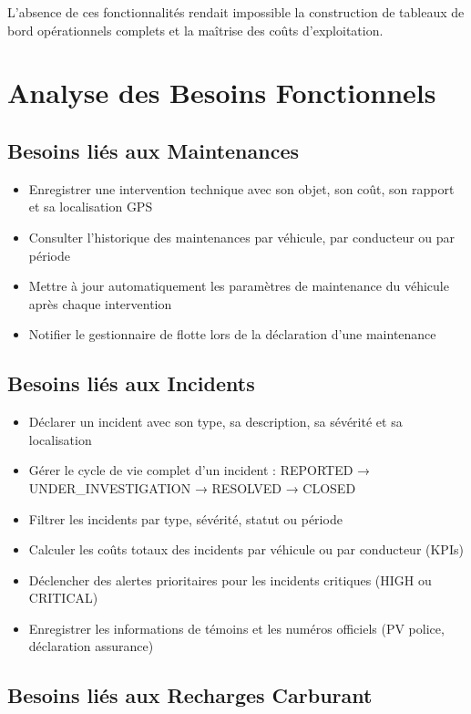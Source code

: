 \documentclass[12pt,a4paper]{report}
\begin{document}
L'absence de ces fonctionnalités rendait impossible la construction de tableaux de bord opérationnels complets et la maîtrise des coûts d'exploitation.

\section{Analyse des Besoins Fonctionnels}

\subsection{Besoins liés aux Maintenances}

\begin{itemize}[leftmargin=2cm]
  \item Enregistrer une intervention technique avec son objet, son coût, son rapport et sa localisation GPS
  \item Consulter l'historique des maintenances par véhicule, par conducteur ou par période
  \item Mettre à jour automatiquement les paramètres de maintenance du véhicule après chaque intervention
  \item Notifier le gestionnaire de flotte lors de la déclaration d'une maintenance
\end{itemize}

\subsection{Besoins liés aux Incidents}

\begin{itemize}[leftmargin=2cm]
  \item Déclarer un incident avec son type, sa description, sa sévérité et sa localisation
  \item Gérer le cycle de vie complet d'un incident : REPORTED → UNDER\_INVESTIGATION → RESOLVED → CLOSED
  \item Filtrer les incidents par type, sévérité, statut ou période
  \item Calculer les coûts totaux des incidents par véhicule ou par conducteur (KPIs)
  \item Déclencher des alertes prioritaires pour les incidents critiques (HIGH ou CRITICAL)
  \item Enregistrer les informations de témoins et les numéros officiels (PV police, déclaration assurance)
\end{itemize}

\subsection{Besoins liés aux Recharges Carburant}
\end{document}
